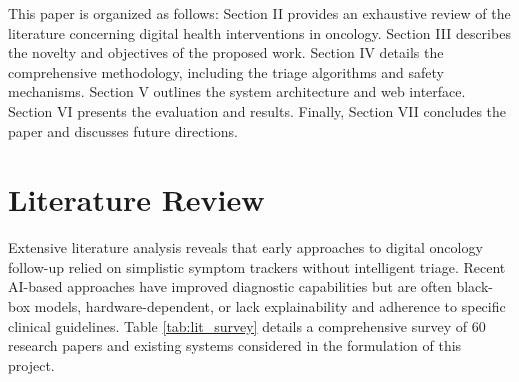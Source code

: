 \documentclass[10pt,journal,compsoc]{IEEEtran}
\begin{document}
This paper is organized as follows: Section II provides an exhaustive review of the literature concerning digital health interventions in oncology. Section III describes the novelty and objectives of the proposed work. Section IV details the comprehensive methodology, including the triage algorithms and safety mechanisms. Section V outlines the system architecture and web interface. Section VI presents the evaluation and results. Finally, Section VII concludes the paper and discusses future directions.

\section{Literature Review}
Extensive literature analysis reveals that early approaches to digital oncology follow-up relied on simplistic symptom trackers without intelligent triage. Recent AI-based approaches have improved diagnostic capabilities but are often black-box models, hardware-dependent, or lack explainability and adherence to specific clinical guidelines. Table \ref{tab:lit_survey} details a comprehensive survey of 60 research papers and existing systems considered in the formulation of this project.
\end{document}
